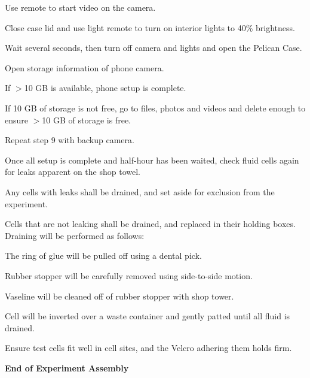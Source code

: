 \begin{checklist}
\begin{checklist}
        \item Use remote to start video on the camera.
        \item Close case lid and use light remote to turn on interior lights to 40\% brightness.
        \item Wait several seconds, then turn off camera and lights and open the Pelican Case.
    \end{checklist}
    \item Open storage information of phone camera.
    \begin{checklist}
        \item If $>$10 GB is available, phone setup is complete.
        \item If 10 GB of storage is not free, go to files, photos and videos and delete enough to ensure $>$10 GB of storage is free.
        \item Repeat step 9 with backup camera.
    \end{checklist}
    \item Once all setup is complete and half-hour has been waited, check fluid cells again for leaks apparent on the shop towel.
    \begin{checklist}
        \item Any cells with leaks shall be drained, and set aside for exclusion from the experiment.
        \item Cells that are not leaking shall be drained, and replaced in their holding boxes. Draining will be performed as follows:
        \begin{checklist}
            \item The ring of glue will be pulled off using a dental pick.
            \item Rubber stopper will be carefully removed using side-to-side motion.
            \item Vaseline will be cleaned off of rubber stopper with shop tower.
            \item Cell will be inverted over a waste container and gently patted until all fluid is drained.
        \end{checklist}
    \end{checklist}
    \item Ensure test cells fit well in cell sites, and the Velcro adhering them holds firm.
\end{checklist}
\textbf{End of Experiment Assembly}

\newpage{}
